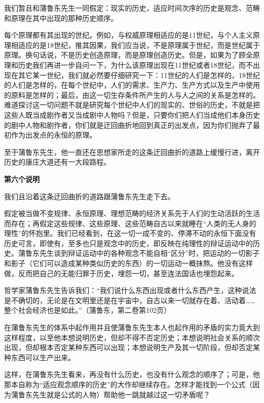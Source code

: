 \documentclass[a4paper,twoside,12pt,AutoFakeBold]{ctexart}
\begin{document}
我们暂且和蒲鲁东先生一同假定：现实的历史，适应时间次序的历史是观念、范畴和原理在其中出现的那种历史顺序。

每个原理都有其出现的世纪。例如，与权威原理相适应的是11世纪，与个人主义原理相适应的是18世纪，推其因果，我们应当说，不是原理属于世纪，而是世纪属于原理。换句话说，不是历史创造原理，而是原理创造历史。但是，如果为了顾全原理和历史我们再进一步自问一下，为什么该原理出现在11世纪或者18世纪，而不出现在其它某一世纪，我们就必然要仔细研究一下：11世纪的人们是怎样的，18世纪的人们是怎样的，在每个世纪中，人们的需求、生产力、生产方式以及生产中使用的原料是怎样的；最后，由这一切生存条件所产生的人与人之间的关系是怎样的。难道探讨这一切问题不就是研究每个世纪中人们的现实的、世俗的历史，不就是把这些人既当成剧作者又当成剧中人物吗？但是，只要你们把人们当成他们本身历史的剧中人物和剧作者，你们就是迂回曲折地回到真正的出发点，因为你们抛弃了最初作为出发点的永恒的原理。

至于蒲鲁东先生，他一直还在思想家所走的这条迂回曲折的道路上缓慢行进，离开历史的康庄大道还有一大段路程。

\begin{center}
    \textbf{第六个说明}
\end{center}

我们且沿着这条迂回曲折的道路跟蒲鲁东先生走下去。

假定被当做不变规律、永恒原理、理想范畴的经济关系先于人们的生动活跃的生活而存在；再假定这些规律、这些原理、这些范畴自古以来就睡在“人类的无人身的理性”的怀抱里。我们已经看到，在这一切一成不变的、停滞不动的永恒下面没有历史可言，即使有，至多也只是观念中的历史，即反映在纯理性的辩证运动中的历史。蒲鲁东先生谈到辩证运动中的各种观念不能自相“区分”时，把运动的一切影子和影子（它们可以造成某种类似历史的东西）的一切运动一概抹熬。他没有这样做，反而把自己的无能归罪于历史，埋怨一切，甚至连法国话也埋怨起来。

哲学家蒲鲁东先生告诉我们：“我们说什么东西出现或者什么东西产生，这种说法是不确切的，无论是在文明里还是在宇宙中，自古以来一切就存在着、活动着……整个社会经济也是如此。”（蒲鲁东，第二卷第102页）

在蒲鲁东先生的体系中起作用并且使蒲鲁东先生本人也起作用的矛盾的实力竟大到这样程度，以至他本想说明历史，但却不得不否定历史；本想说明社会关系的顺次出现，但却根本否定某种东西可以出现；本想说明生产及其一切阶段，但却否定某种东西可以生产出来。

这样，在蒲鲁东先生看来，再没有什么历史，也没有什么观念的顺序了；可是，他那本自称为“适应观念顺序的历史”的大作却继续存在。怎样才能找到一个公式（因为蒲鲁东先生就是公式的人物）帮助他一跳就越过这一切矛盾呢？
\end{document}
